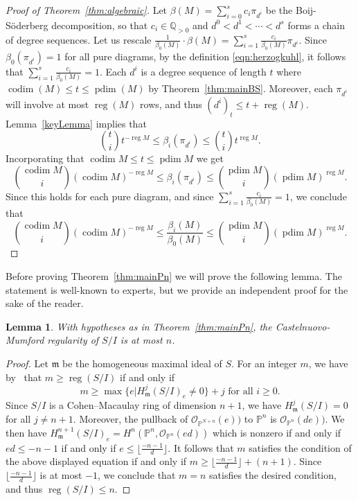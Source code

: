 \documentclass[12pt]{amsart}
\newtheorem{lemma}{Lemma}[section]
\theoremstyle{remark}
\newcommand{\pdim}{\operatorname{pdim}}
\newcommand{\reg}{\operatorname{reg}}
\newcommand{\cO}{{\mathcal O}}
\newcommand{\codim}{\operatorname{codim}}
\newcommand{\PP}{\mathbb P}
\newcommand{\QQ}{\mathbb Q}
\begin{document}
\begin{proof}[Proof of Theorem~\ref{thm:algebraic}]
Let $\beta(M)=\sum_{i=0}^s c_i\pi_{d^i}$ be the Boij-S\"oderberg decomposition, so that $c_i \in \QQ_{>0}$ and $d^0<d^1<\cdots <d^s$ forms a chain of degree sequences.  Let us rescale $\frac{1}{\beta_0(M)} \cdot \beta(M) = \sum_{i=1}^s \frac{c_i}{\beta_0(M)} \pi_{d^i}$.  Since $\beta_0( \pi_{d^i})=1$ for all pure diagrams, by the definition \eqref{eqn:herzogkuhl}, it follows that $\sum_{i=1}^s \frac{c_i}{\beta_0(M)} = 1$.  Each $d^i$ is a degree sequence of length $t$ where $\codim(M) \leq t \leq \pdim(M)$ by Theorem~\ref{thm:mainBS}.  Moreover, each $\pi_{d^i}$ will involve at most $\reg(M)$ rows, and thus $(d^i)_t\leq t+\reg(M)$.  Lemma~\ref{keyLemma} implies that
\[
\binom{t}{i}t^{-\reg M} \leq \beta_i(\pi_{d^i}) \leq \binom{t}{i}t^{\reg M}.
\]
Incorporating that $\codim M \leq t\leq \pdim M$ we get
\[
\binom{\codim M}{i}(\codim M)^{-\reg M} \leq \beta_i(\pi_{d^i}) \leq \binom{\pdim M}{i}(\pdim M)^{\reg M}.
\]
Since this holds for each pure diagram, and since $\sum_{i=1}^s \frac{c_i}{\beta_0(M)} = 1$, we conclude that
\[
\binom{\codim M}{i}(\codim M)^{-\reg M} \leq \frac{\beta_i(M)}{\beta_0(M)} \leq \binom{\pdim M}{i}(\pdim M)^{\reg M}.
\]
\end{proof}

Before proving Theorem~\ref{thm:mainPn} we will prove the following lemma. The statement is well-known to experts, but we provide an independent proof for the sake of the reader.

\begin{lemma}\label{lem:reg}
With hypotheses as in Theorem~\ref{thm:mainPn}, the Castelnuovo-Mumford regularity of $S/I$ is at most $n$.
\end{lemma}
\begin{proof}
Let $\mathfrak m$ be the homogeneous maximal ideal of $S$.  For an integer $m$, we have by~\cite[Theorem 4.3]{eisenbud-gos} that $m\geq \reg(S/I)$ if and only if
\[
m\geq \max \{ e  | H^{j}_{\mathfrak m}(S/I)_e \ne 0\} + j \text{ for all } i\geq 0.
\]
Since $S/I$ is a Cohen--Macaulay ring of dimension $n+1$, we have $H^j_{\mathfrak m}(S/I)=0$ for all $j\ne n+1$.  Moreover, the pullback of $\cO_{\PP^{N+n}}(e))$ to $\PP^n$ is $\cO_{\PP^n}(de))$.  We then have $H^{n+1}_{\mathfrak m}(S/I)_e = H^{n}(\PP^n, \cO_{\PP^n}(ed))$ which is nonzero if and only if $ed \leq -n-1$ if and only if $e \leq \lfloor \frac{-n-1}{d}\rfloor$.  It follows that $m$ satisfies the condition of the above displayed equation if and only if $m\geq \lfloor \frac{-n-1}{d}\rfloor+(n+1)$.    Since $\lfloor \frac{-n-1}{d}\rfloor$ is at most $-1$, we conclude that $m=n$ satisfies the desired condition, and thus $\reg(S/I) \leq n$.
\end{proof}
\end{document}
